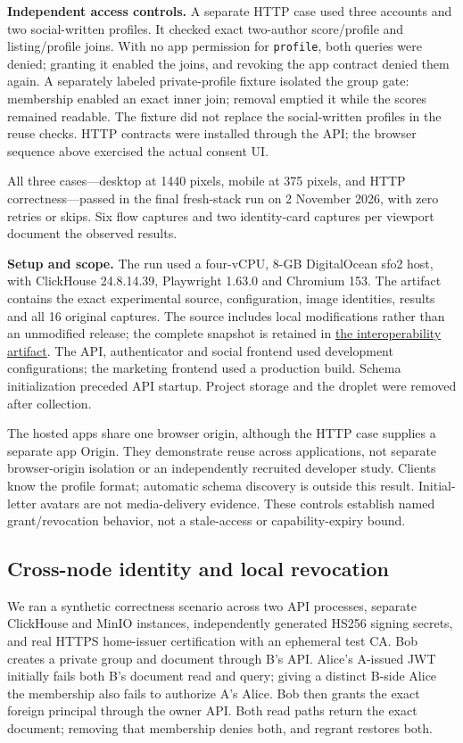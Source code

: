 \documentclass[sigconf, nonacm]{acmart}
\newcommand{\artifactbase}{https://github.com/jacoby149/web10}
\newcommand{\domainartifactrev}{26720acba859c7eb03fc5d26a6221cdde5b764a1}
\newcommand{\domainartifactdir}[2]{\href{\artifactbase/tree/\domainartifactrev/#1}{#2}}
\begin{document}
\textbf{Independent access controls.} A separate HTTP case used three accounts
and two social-written profiles. It checked exact two-author score/profile and
listing/profile joins. With no app permission for \texttt{profile}, both queries
were denied; granting it enabled the joins, and revoking the app contract denied
them again. A separately labeled private-profile fixture isolated the group
gate: membership enabled an exact inner join; removal emptied it while the
scores remained readable. The fixture did not replace the social-written
profiles in the reuse checks. HTTP contracts were installed through the API;
the browser sequence above exercised the actual consent UI.

All three cases---desktop at 1440 pixels, mobile at 375 pixels, and HTTP
correctness---passed in the final fresh-stack run on 2 November 2026, with
zero retries or skips. Six flow captures and two identity-card captures per
viewport document the observed results.

\textbf{Setup and scope.} The run used a four-vCPU, 8-GB DigitalOcean sfo2 host, with
ClickHouse 24.8.14.39, Playwright 1.63.0 and Chromium 153. The artifact contains
the exact experimental source, configuration, image identities, results and all
16 original captures. The source includes local modifications rather than an
unmodified release; the complete snapshot is retained in
\domainartifactdir{research/interoperability-demo}{the interoperability artifact}.
The API, authenticator and social frontend used development configurations;
the marketing frontend used a production build. Schema initialization preceded
API startup. Project storage and the droplet were removed after collection.

The hosted apps share one browser origin, although the HTTP case supplies a
separate app Origin. They demonstrate reuse across applications, not separate
browser-origin isolation or an independently recruited developer study. Clients
know the profile format; automatic schema discovery is outside this result.
Initial-letter avatars are not media-delivery evidence. These controls establish
named grant/revocation behavior, not a stale-access or capability-expiry bound.

\subsection{Cross-node identity and local revocation}
\label{sec:federation-results}

We ran a synthetic correctness scenario across two API processes, separate
ClickHouse and MinIO instances, independently generated HS256 signing secrets,
and real HTTPS home-issuer certification with an ephemeral test CA. Bob creates
a private group and document through B's API. Alice's A-issued JWT initially
fails both B's document read and query; giving a distinct B-side Alice the
membership also fails to authorize A's Alice. Bob then grants the exact foreign
principal through the owner API. Both read paths return the exact document;
removing that membership denies both, and regrant restores both.
\end{document}
